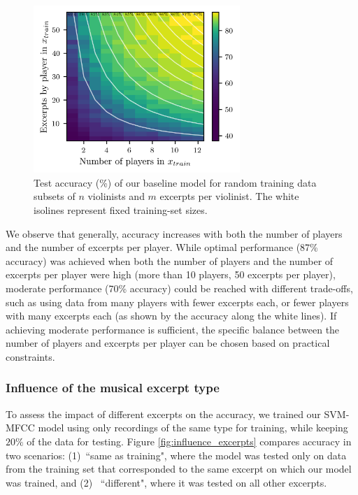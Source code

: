 \documentclass[11pt]{article}
\begin{document}
\begin{figure}[!ht]
  \centerline{
      \includegraphics[width=7.8cm]{figures/matrix.png}
  }
  \caption{Test accuracy (\%) of our baseline model for random training data subsets of $n$ violinists and $m$ excerpts per violinist. The white isolines represent fixed training-set sizes.}
  \label{fig:influence_n}
\end{figure}

\noindent We observe that generally, accuracy increases with both the number of players and the number of excerpts per player. While optimal performance (87\% accuracy) was achieved when both the number of players and the number of excerpts per player were high (more than 10 players, 50 excerpts per player), moderate performance (70\% accuracy) could be reached with different trade-offs, such as using data from many players with fewer excerpts each, or fewer players with many excerpts each (as shown by the accuracy along the white lines). If achieving moderate performance is sufficient, the specific balance between the number of players and excerpts per player can be chosen based on practical constraints.

\subsubsection{Influence of the musical excerpt type}
To assess the impact of different excerpts on the accuracy, we trained our SVM-MFCC model using only recordings of the same type for training, while keeping $20\%$ of the data for testing. 
Figure \ref{fig:influence_excerpts} compares accuracy in two scenarios: (1)~``same as training", where the model was tested only on data from the training set that corresponded to the same excerpt on which our model was trained, and (2)~ ``different", where it was tested on all other excerpts.
\end{document}
